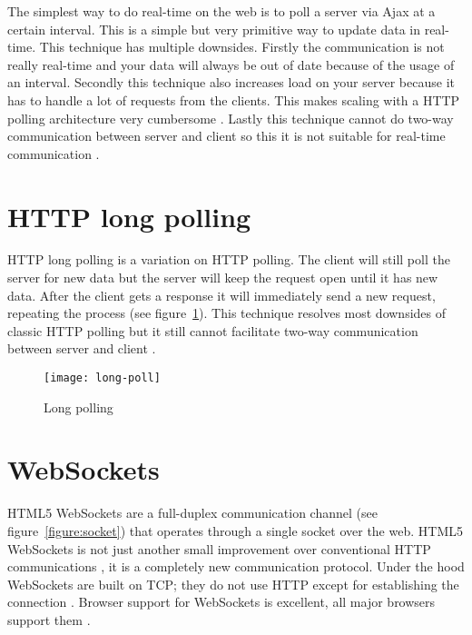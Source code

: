 The simplest way to do real-time on the web is to poll a server via Ajax at a certain interval. This is a simple but very primitive way to update data in real-time. This technique has multiple downsides. Firstly the communication is not really real-time and your data will always be out of date because of the usage of an interval. Secondly this technique also increases load on your server because it has to handle a lot of requests from the clients. This makes scaling with a HTTP polling architecture very cumbersome \cite{poll-socket}. Lastly this technique cannot do two-way communication between server and client so this it is not suitable for real-time communication \cite{poll-socket}.

\section{HTTP long polling} %
\label{sub:long-polling}

HTTP long polling is a variation on HTTP polling. The client will still poll the server for new data but the server will keep the request open until it has new data. After the client gets a response it will immediately send a new request, repeating the process \cite{long-poll} (see figure~\ref{figure:long-poll}). This technique resolves most downsides of classic HTTP polling but it still cannot facilitate two-way communication between server and client \cite{poll-socket}.

\begin{figure}[H]
	\centering
	\texttt{[image: long-poll]}
	\caption{Long polling \cite{long-poll}}
	\label{figure:long-poll}
\end{figure}

\section{WebSockets} %
\label{sub:websockets}

HTML5 WebSockets are a full-duplex communication channel (see figure~\ref{figure:socket}) that operates through a single socket over the web. HTML5 WebSockets is not just another small improvement over conventional HTTP communications \cite{poll-socket}, it is a completely new communication protocol. Under the hood WebSockets are built on TCP; they do not use HTTP except for establishing the connection \cite{socket-wiki}. Browser support for WebSockets is excellent, all major browsers support them \cite{socket-browser}.


